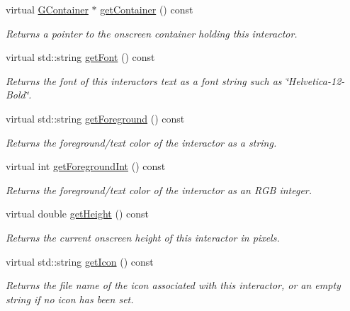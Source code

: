 \begin{DoxyCompactItemize}
virtual \mbox{\hyperlink{classsgl_1_1GContainer}{G\+Container}} $\ast$ \mbox{\hyperlink{classsgl_1_1GInteractor_a7a6e317c29d61030929b4cd2d1c00fe7}{get\+Container}} () const
\begin{DoxyCompactList}\small\item\em Returns a pointer to the onscreen container holding this interactor. \end{DoxyCompactList}\item 
virtual std\+::string \mbox{\hyperlink{classsgl_1_1GInteractor_a894a5502900794eeb27d084c21f1d77d}{get\+Font}} () const
\begin{DoxyCompactList}\small\item\em Returns the font of this interactor\textquotesingle{}s text as a font string such as \char`\"{}\+Helvetica-\/12-\/\+Bold\char`\"{}. \end{DoxyCompactList}\item 
virtual std\+::string \mbox{\hyperlink{classsgl_1_1GInteractor_a4fa2d8b0192a3a5b4af4bbfe71194d03}{get\+Foreground}} () const
\begin{DoxyCompactList}\small\item\em Returns the foreground/text color of the interactor as a string. \end{DoxyCompactList}\item 
virtual int \mbox{\hyperlink{classsgl_1_1GInteractor_ac3b12ab385a6ef9ae90fc879860ba726}{get\+Foreground\+Int}} () const
\begin{DoxyCompactList}\small\item\em Returns the foreground/text color of the interactor as an R\+GB integer. \end{DoxyCompactList}\item 
virtual double \mbox{\hyperlink{classsgl_1_1GInteractor_a1e7e353362434072875264cf95629f99}{get\+Height}} () const
\begin{DoxyCompactList}\small\item\em Returns the current onscreen height of this interactor in pixels. \end{DoxyCompactList}\item 
virtual std\+::string \mbox{\hyperlink{classsgl_1_1GInteractor_aaed62a73004939a64da6f0eb9eb64d73}{get\+Icon}} () const
\begin{DoxyCompactList}\small\item\em Returns the file name of the icon associated with this interactor, or an empty string if no icon has been set. \end{DoxyCompactList}\item 

\end{DoxyCompactItemize}
